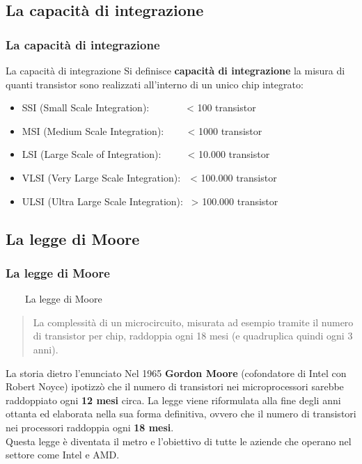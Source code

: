 \subsection[La capacità di integrazione]{La capacità di integrazione}
\begin{frame}
	\frametitle{La capacità di integrazione}
	
	\begin{block}{La capacità di integrazione}
		Si definisce \textbf{capacità di integrazione} la misura di quanti transistor sono realizzati all'interno di un unico chip integrato:
		\begin{itemize}
			\item SSI (Small Scale Integration): $\qquad\quad\,$ < 100 transistor
			\item MSI (Medium Scale Integration): $\quad\;\;\:$ < 1000 transistor
			\item LSI (Large Scale of Integration): $\quad\;\;\,\,\,$ < 10.000 transistor
			\item VLSI (Very Large Scale Integration): $\,\,$ < 100.000 transistor
			\item ULSI (Ultra Large Scale Integration): $\,$ > 100.000 transistor
		\end{itemize}
		
	\end{block}
	
\end{frame}


\subsection[La legge di Moore]{La legge di Moore}
\begin{frame}
	\frametitle{La legge di Moore}
	
	\begin{block}{$\qquad$La legge di Moore}
		\begin{quote}
			La complessità di un microcircuito, misurata ad esempio tramite il numero di transistor per chip, raddoppia ogni 18 mesi (e quadruplica quindi ogni 3 anni).
		\end{quote}		
	\end{block}
	
	\begin{block}{La storia dietro l'enunciato}
		Nel 1965 \textbf{Gordon Moore} (cofondatore di Intel con Robert Noyce) ipotizzò che il numero di transistori nei microprocessori sarebbe raddoppiato ogni \textbf{12 mesi} circa. 	La legge viene riformulata alla fine degli anni ottanta ed elaborata nella sua forma definitiva, ovvero che il numero di transistori nei processori raddoppia ogni \textbf{18 mesi}.\\
		Questa legge è diventata il metro e l'obiettivo di tutte le aziende che operano nel settore come Intel e AMD.
	\end{block}
	
\end{frame}


